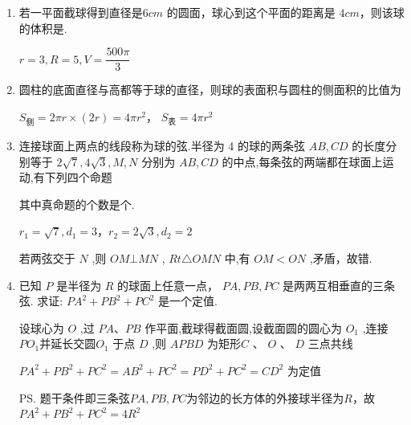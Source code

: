 \begin{enumerate}
    \item 若一平面截球得到直径是$6cm$ 的圆面，球心到这个平面的距离是 $4cm$，则该球的体积是.
    \begin{jieda}
        $r = 3, R = 5, V = \dfrac{500\pi}{3}$
    \end{jieda}

    \item 圆柱的底面直径与高都等于球的直径，则球的表面积与圆柱的侧面积的比值为
    \begin{jieda}
        $S_{\text{侧}} = 2\pi r \times (2r) = 4\pi r^2$， $S_{\text{表}} = 4\pi r^2$
    \end{jieda}

    \item 连接球面上两点的线段称为球的弦.半径为 4 的球的两条弦 ${AB},{CD}$ 的长度分别等于 $2\sqrt{7},4\sqrt{3},M,N$ 分别为 ${AB},{CD}$ 的中点,每条弦的两端都在球面上运动,有下列四个命题
    其中真命题的个数是个.
    \begin{jieda}
        $r_1 = \sqrt{7}, d_1 = 3$，$r_2 = 2\sqrt{3}, d_2 = 2$

        若两弦交于 $N$ ,则 ${OM}\bot {MN}$ , ${{Rt}}\triangle {OMN}$ 中,有 ${OM} < {ON}$ ,矛盾，故错.
    \end{jieda}
    
    \item 已知 $P$ 是半径为 $R$ 的球面上任意一点， ${PA},{PB},{PC}$ 是两两互相垂直的三条弦. 求证: $P{A}^{2} + P{B}^{2} + P{C}^{2}$ 是一个定值.
    \begin{jieda}
    设球心为 $O$ ,过 ${PA}\text{、}{PB}$ 作平面,截球得截面圆,设截面圆的圆心为 ${O}_{1}$ ,连接 $P{O}_{1}$并延长交圆${O}_{1}$ 于点 $D$ ,则 ${APBD}$ 为矩形$C$ 、 $O$ 、 $D$ 三点共线
    
    $P{A}^{2} + P{B}^{2} + P{C}^{2} = A{B}^{2} + P{C}^{2} = P{D}^{2} + P{C}^{2} = C{D}^{2}$ 为定值
    
    \ps 题干条件即三条弦${PA},{PB},{PC}$为邻边的长方体的外接球半径为$R$，故$P{A}^{2} + P{B}^{2} + P{C}^{2} = 4R^2$
    \end{jieda}


\end{enumerate}
